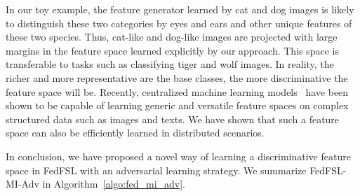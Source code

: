In our toy example, the feature generator learned by cat and dog images is likely to distinguish these two categories by eyes and ears and other unique features of these two species. Thus, cat-like and dog-like images are projected with large margins in the feature space learned explicitly by our approach. This space is transferable to tasks such as classifying tiger and wolf images. In reality, the richer and more representative are the base classes, the more discriminative the feature space will be. 
Recently, centralized machine learning models~\cite{sharif2014cnn, vaswani2017attention} have been shown to be capable of learning generic and versatile feature spaces on complex structured data such as images and texts. We have shown that such a feature space can also be efficiently learned in distributed scenarios.

In conclusion, we have proposed a novel way of learning a discriminative feature space in FedFSL with an adversarial learning strategy.
We summarize FedFSL-MI-Adv in Algorithm~\ref{algo:fed_mi_adv}.





